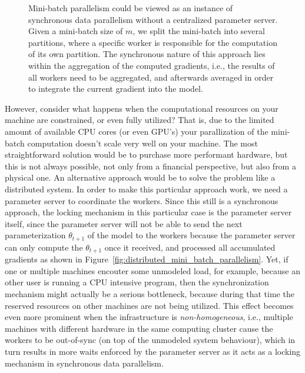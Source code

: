 \begin{figure}[H]
  \caption{Mini-batch parallelism could be viewed as an instance of synchronous data parallelism without a centralized parameter server. Given a mini-batch size of $m$, we split the mini-batch into several partitions, where a specific worker is responsible for the computation of its own partition. The synchronous nature of this approach lies within the aggregation of the computed gradients, i.e., the results of all workers need to be aggregated, and afterwards averaged in order to integrate the current gradient into the model.}
  \label{fig:minibatch_data_parallelism}
\end{figure}

However, consider what happens when the computational resources on your machine are constrained, or even fully utilized? That is, due to the limited amount of available CPU cores (or even GPU's) your parallization of the mini-batch computation doesn't scale very well on your machine. The most straightforward solution would be to purchase more performant hardware, but this is not always possible, not only from a financial perspective, but also from a physical one. An alternative approach would be to solve the problem like a distributed system. In order to make this particular approach work, we need a parameter server to coordinate the workers. Since this still is a synchronous approach, the locking mechanism in this particular case is the parameter server itself, since the parameter server will not be able to send the next parameterization $\theta_{t+1}$ of the model to the workers because the parameter server can only compute the $\theta_{t+1}$ once it received, and processed all accumulated gradients as shown in Figure~\ref{fig:distributed_mini_batch_parallelism}. Yet, if one or multiple machines encouter some unmodeled load, for example, because an other user is running a CPU intensive program, then the synchronization mechanism might actually be a serious bottleneck, because during that time the reserved resources on other machines are not being utilized. This effect becomes even more prominent when the infrastructure is \emph{non-homogeneous}, i.e., multiple machines with different hardware in the same computing cluster cause the workers to be out-of-sync (on top of the unmodeled system behaviour), which in turn results in more waits enforced by the parameter server as it acts as a locking mechanism in synchronous data parallelism.


